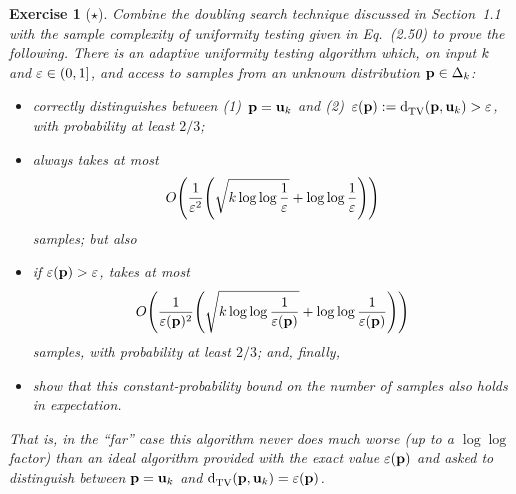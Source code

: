 \documentclass[biber]{nowfnt} %
\newtheorem{question}{Exercise}[chapter]
\begin{document}
\begin{question}[$\star$]\label{ex:unif:adaptive}
Combine the doubling search technique discussed in Section~1.1 with the sample complexity of uniformity testing given in Eq.~(2.50) to prove the following. There is an adaptive uniformity testing algorithm which, on input $k$ and $\varepsilon\in(0,1]$, and access to samples from an unknown distribution $\mathbf{p}\in\Delta_{k}$:
\begin{itemize}
  \item correctly distinguishes between (1)~$\mathbf{p}=\mathbf{u}_k$ and (2)~$\dst(\p)\eqdef \totalvardist{\p}{\uniform_\ab} > \dst$, with probability at least $2/3$;
  \item always takes at most 
    \[
      \bigO{\frac{1}{\dst^2}\Paren{\sqrt{\ab \log \log \frac{1}{\dst} } + \log \log \frac{1}{\dst} }}
    \] samples; but also
  \item if $\varepsilon(\mathbf{p}) > \varepsilon$, takes at most
    \[
      \bigO{\frac{1}{\dst(\p)^2}\Paren{\sqrt{\ab \log \log \frac{1}{\dst(\p)} } + \log \log \frac{1}{\dst(\p)} }}
    \] samples, with probability at least $2/3$; and, finally,
  \item show that this constant-probability bound on the number of samples also holds \emph{in expectation.}
\end{itemize}
That is, in the ``far'' case this algorithm never does much worse (up to a $\log\log$ factor) than an ideal algorithm provided with the exact value $\varepsilon(\mathbf{p})$ and asked to distinguish between $\mathbf{p}=\mathbf{u}_k$ and $\totalvardist{\p}{\uniform_\ab} = \dst(\p)$.
\end{question}
\end{document}
